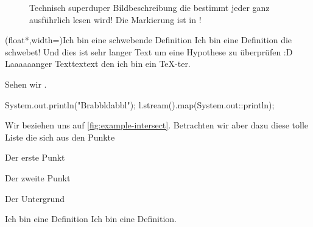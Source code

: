 \documentclass[userip,ngerman]{lecture-print}
\begin{document}
\Blindtext[1]
\begin{figure}
    \centering{}
    \caption{Technisch superduper Bildbeschreibung die bestimmt jeder ganz ausführlich lesen wird! Die Markierung ist in \tikzAname!}
    \label{fig:example-intersect}
\end{figure}
\begin{definition}(float*,width=\textwidth){Ich bin eine schwebende Definition}
    \label{def:floatingdef}Ich bin eine Definition die schwebet! Und dies ist sehr langer Text um eine Hypothese zu überprüfen :D Laaaaaanger Texttextext den ich bin ein \TeX-ter.
\end{definition}
\Blindtext[2]
Sehen wir .
\begin{java*}
System.out.println("Brabbldabbl");
l.stream().map(System.out::println);
\end{java*}
Wir beziehen uns auf \autoref{fig:example-intersect}. Betrachten wir aber dazu diese tolle Liste die sich aus den Punkte \begin{inlist}
    \item Der erste Punkt
    \item Der zweite Punkt
    \item Der Untergrund
\end{inlist}
\Blindtext[2]
\begin{definition}{Ich bin eine Definition}
    Ich bin eine Definition.
\end{definition}
\end{document}
